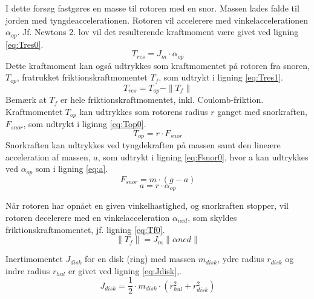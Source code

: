 I dette forsøg fastgøres en masse til rotoren med en snor.
Massen lades falde til jorden med tyngdeaccelerationen.
Rotoren vil accelerere med vinkelaccelerationen \(\alpha_{op}\).
Jf. Newtons 2. lov vil det resulterende kraftmoment være givet ved ligning \ref{eq:Tres0}.
\begin{equation}
	T_{res}=J_m\cdot\alpha_{op}
	\label{eq:Tres0}
 \end{equation}
Dette kraftmoment kan også udtrykkes som kraftmomentet på rotoren fra snoren, \(T_{op}\),
fratrukket friktionskraftmomentet \(T_f\), som udtrykt i ligning \ref{eq:Tres1}.
\begin{equation}
	T_{res}=T_{op}-\|T_f\|
	\label{eq:Tres1}
 \end{equation}
Bemærk at \(T_f\) er hele friktionskraftmomentet, inkl. Coulomb-friktion.
Kraftmomentet \(T_{op}\) kan udtrykkes som rotorens radius \(r\) ganget med snorkraften, \(F_{snor}\),
som udtrykt i liginng \ref{eq:Top0}.
\begin{equation}
	T_{op}=r\cdot{F_{snor}}
	\label{eq:Top0}
 \end{equation}
Snorkraften kan udtrykkes ved tyngdekraften på massen samt den lineære acceleration af massen, \(a\),
som udtrykt i ligning \ref{eq:Fsnor0}, hvor a kan udtrykkes ved \(\alpha_{op}\) som i ligning \ref{eq:a}.
\begin{equation}
	F_{snor}=m\cdot(g-a)
	\label{eq:Fsnor0}
 \end{equation}
\begin{equation}
	a=r\cdot\alpha_{op}
	\label{eq:a}
 \end{equation}

Når rotoren har opnået en given vinkelhastighed, og snorkraften stopper,
vil rotoren decelerere med en vinkelacceleration \(\alpha_{ned}\), som skyldes friktionskraftmomentet,
jf. ligning \ref{eq:Tf0}.
\begin{equation}
	\|T_f\|=J_m\|\alpha{ned}\|
	\label{eq:Tf0}
 \end{equation}

Inertimomentet \(J_{disk}\) for en disk (ring) med massen \(m_{disk}\), ydre radius \(r_{disk}\) og
indre radius \(r_{hul}\) er givet ved ligning \ref{eq:Jdisk},\citep[Side. 255, tabel 10-2b]{fund_of_physics}.
\begin{equation}
	J_{disk}=\frac{1}{2}\cdot{m_{disk}}\cdot\left(r_{hul}^2+r_{disk}^2\right)
	\label{eq:Jdisk}
 \end{equation}

